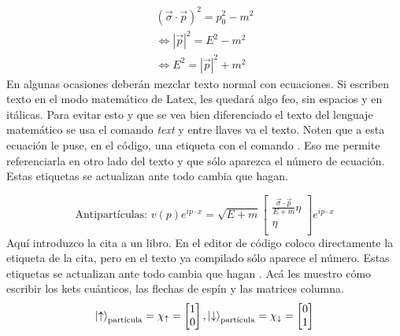 \documentclass[letter,twoside,12pt]{book}
\begin{document}
\begin{eqnarray}
     (\Vec{\sigma}\cdot\Vec{p})^2 = p_0^2-m^2 \nonumber \\
     \Leftrightarrow |\Vec{p}|^2=E^2-m^2 \nonumber \\
     \Leftrightarrow E^2=|\Vec{p}|^2+m^2
\end{eqnarray}
En algunas ocasiones deberán mezclar texto normal con ecuaciones. Si escriben texto en el modo matemático de Latex, les quedará algo feo, sin espacios y en itálicas. Para evitar esto y que se vea bien diferenciado el texto del lenguaje matemático se usa el comando \textit{text} y entre llaves va el texto. Noten que a esta ecuación le puse, en el código, una etiqueta con el comando . Eso me permite referenciarla en otro lado del texto y que sólo aparezca el número de ecuación. Estas etiquetas se actualizan ante todo cambia que hagan.

\begin{equation}
    \text{Antipartículas: } v(p)e^{ip\cdot x}=\sqrt{E+m}\begin{bmatrix}
\frac{\Vec{\sigma}\cdot\Vec{p}}{E+m} \eta\\
 \eta\\
\end{bmatrix}e^{ip\cdot x} \label{antiespinor}
\end{equation}
Aquí introduzco la cita a un libro. En el editor de código coloco directamente la etiqueta de la cita, pero en el texto ya compilado sólo aparece el número. Estas etiquetas se actualizan ante todo cambia que hagan
\cite{Lancaster}.
Acá les muestro cómo escribir los kets cuánticos, las flechas de espín y las matrices columna.
\begin{equation}
\ket{\uparrow}_{\text{partícula}}=\chi_{\uparrow}=\begin{bmatrix}
1\\
0\\
\end{bmatrix},
\ket{\downarrow}_{\text{partícula}}=\chi_{\downarrow}=\begin{bmatrix}
0\\
1\\
\end{bmatrix}
\end{equation}
\end{document}
